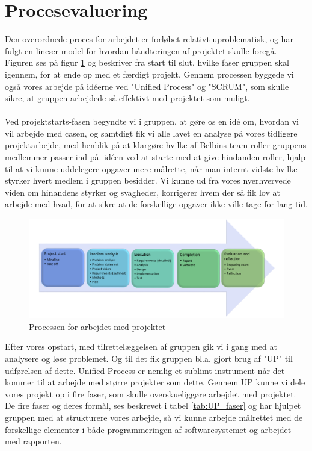 \clearpage
\section{Procesevaluering}
Den overordnede proces for arbejdet er forløbet relativt uproblematisk, og har fulgt en lineær model for hvordan håndteringen af projektet skulle foregå. Figuren ses på figur \ref{fig:processen} og beskriver fra start til slut, hvilke faser gruppen skal igennem, for at ende op med et færdigt projekt. Gennem processen byggede vi også vores arbejde på idéerne ved "Unified Process" og "SCRUM", som skulle sikre, at gruppen arbejdede så effektivt med projektet som muligt.\\\\
Ved projektstarts-fasen begyndte vi i gruppen, at gøre os en idé om, hvordan vi vil arbejde med casen, og samtdigt fik vi alle lavet en analyse på vores tidligere projektarbejde, med henblik på at klargøre hvilke af Belbins team-roller gruppens medlemmer passer ind på. idéen ved at starte med at give hindanden roller, hjalp til at vi kunne uddelegere opgaver mere målrette, når man internt vidste hvilke styrker hvert medlem i gruppen besidder. Vi kunne ud fra vores nyerhvervede viden om hinandens styrker og svagheder, korrigerer hvem der så fik lov at arbejde med hvad, for at sikre at de forskellige opgaver ikke ville tage for lang tid. 
\begin{figure}[H]
    \centering
    \includegraphics[width=1\textwidth]{images/processen.png}
    \caption{Processen for arbejdet med projektet}
    \label{fig:processen}
\end{figure}
Efter vores opstart, med tilrettelæggelsen af gruppen gik vi i gang med at analysere og løse problemet. Og til det fik gruppen bl.a. gjort brug af "UP" til udførelsen af dette. Unified Process er nemlig et sublimt instrument når det kommer til at arbejde med større projekter som dette. Gennem UP kunne vi dele vores projekt op i fire faser, som skulle overskueliggøre arbejdet med projektet. De fire faser og deres formål, ses beskrevet i tabel \ref{tab:UP_faser} og har hjulpet gruppen med at strukturere vores arbejde, så vi kunne arbejde målrettet med de forskellige elementer i både programmeringen af softwaresystemet og arbejdet med rapporten. 
